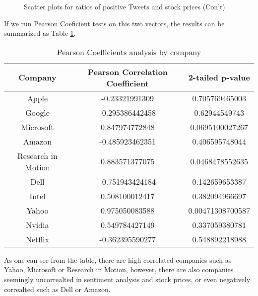 \documentclass[12pt]{article}
\begin{document}
\begin{figure}
\centering
\caption{Scatter plots for ratios of positive Tweets and stock prices (Con't)}
\label{xyplots-ratio-price-02}
\end{figure}

If we run Pearson Coeficient tests on this two vectors, the results can be summarized as Table \ref{coefficients-by-company}.

\begin{table}
\begin{center}
    \begin{tabular}{ | c || c | c | }
        \hline
        \textbf{Company} & \textbf{Pearson Correlation Coefficient} & \textbf{2-tailed p-value} \\ \hline
        \hline
        Apple & -0.23321991309 & 0.705769465003 \\ \hline
        Google & -0.295386442458 & 0.62944549743 \\ \hline
        Microsoft & 0.847974772848 & 0.0695100027267 \\ \hline
        Amazon & -0.485923462351 & 0.406595748044 \\ \hline
        Research in Motion & 0.883571377075 & 0.0468478552635 \\ \hline
        Dell & -0.751943424184 & 0.142659653387 \\ \hline
        Intel & 0.508100012417 & 0.382094966697 \\ \hline
        Yahoo & 0.975050083588 & 0.00471308700587 \\ \hline
        Nvidia & 0.549784427149 & 0.337059380781 \\ \hline
        Netflix & -0.362395590277 & 0.548892218988 \\ \hline
    \end{tabular}
\caption{Pearson Coefficients analysis by company}
\label{coefficients-by-company}
\end{center}
\end{table}

As one can see from the table, there are high correlated companies such as Yahoo, Microsoft or Research in Motion, however, there are also companies seemingly uncorrealted in sentiment analysis and stock prices, or even negatively correalted such as Dell or Amazon.
\end{document}
